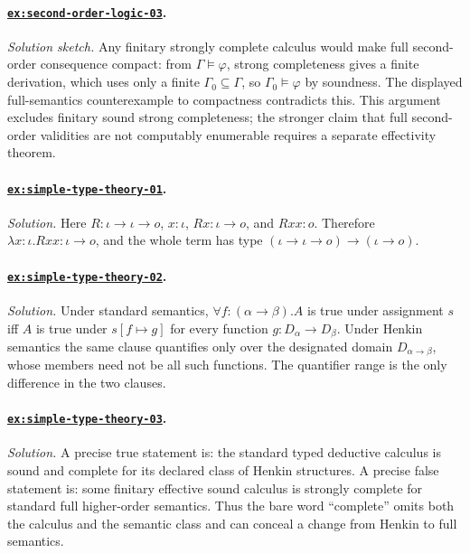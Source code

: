 \documentclass[11pt,oneside,openany]{book}
\theoremstyle{definition}
\theoremstyle{plain}
\theoremstyle{remark}
\newcommand{\entails}{\models}
\begin{document}
\paragraph{\hyperref[ex:second-order-logic-03]{\texttt{ex:second-order-logic-03}}.}
\textit{Solution sketch.}  Any finitary strongly complete calculus would make
full second-order consequence compact: from \(\Gamma\entails\varphi\), strong
completeness gives a finite derivation, which uses only a finite
\(\Gamma_0\subseteq\Gamma\), so \(\Gamma_0\entails\varphi\) by soundness.  The
displayed full-semantics counterexample to compactness contradicts this.  This
argument excludes finitary sound strong completeness; the stronger claim that
full second-order validities are not computably enumerable requires a separate
effectivity theorem.

\paragraph{\hyperref[ex:simple-type-theory-01]{\texttt{ex:simple-type-theory-01}}.}
\textit{Solution.}  Here
\(R:\iota\to\iota\to o\), \(x:\iota\),
\(Rx:\iota\to o\), and \(Rxx:o\).  Therefore
\(\lambda x{:}\iota.Rxx:\iota\to o\), and the whole term has type
\((\iota\to\iota\to o)\to(\iota\to o)\).

\paragraph{\hyperref[ex:simple-type-theory-02]{\texttt{ex:simple-type-theory-02}}.}
\textit{Solution.}  Under standard semantics,
\(\forall f{:}(\alpha\to\beta).A\) is true under assignment \(s\) iff
\(A\) is true under \(s[f\mapsto g]\) for every function
\(g:D_\alpha\to D_\beta\).  Under Henkin semantics the same clause quantifies
only over the designated domain \(D_{\alpha\to\beta}\), whose members need not
be all such functions.  The quantifier range is the only difference in the two
clauses.

\paragraph{\hyperref[ex:simple-type-theory-03]{\texttt{ex:simple-type-theory-03}}.}
\textit{Solution.}  A precise true statement is: the standard typed deductive
calculus is sound and complete for its declared class of Henkin structures.  A
precise false statement is: some finitary effective sound calculus is strongly
complete for standard full higher-order semantics.  Thus the bare word
``complete'' omits both the calculus and the semantic class and can conceal a
change from Henkin to full semantics.
\end{document}
